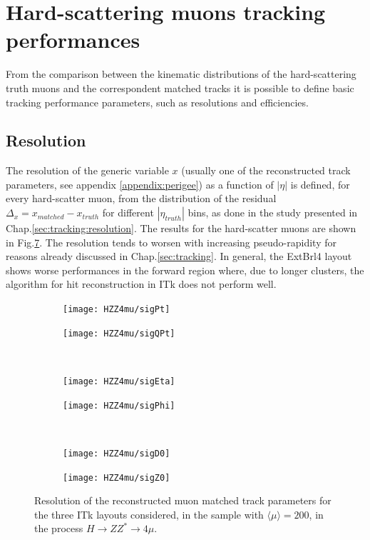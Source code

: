 \documentclass[a4paper,twoside,12pt]{book}
\begin{document}
\section{Hard-scattering muons tracking performances}
From the comparison between the kinematic distributions of the hard-scattering truth muons and the correspondent matched 
tracks it is possible to define basic tracking performance parameters, such as resolutions and efficiencies. \\

\subsection*{Resolution}
The resolution of the generic variable $x$ (usually one of the reconstructed track parameters, see appendix \ref{appendix:perigee}) as a function of $|\eta|$ is defined, for every hard-scatter muon, from the distribution of the residual 
$\Delta_x = x_{matched} - x_{truth}$ for different $|\eta_{truth}|$ bins, as done in the study presented in Chap.\ref{sec:tracking:resolution}. 
The results for the hard-scatter muons are shown in Fig.\ref{fig:HZZ4mu:muonResolution}.
The resolution tends to worsen 
with increasing pseudo-rapidity for reasons already discussed in Chap.\ref{sec:tracking}. In general, the ExtBrl4 layout shows worse performances in the forward region where, due to longer clusters, the algorithm for hit reconstruction in ITk
does not perform well.\\


\begin{figure}
\begin{subfigure}{.5\linewidth}
\texttt{[image: HZZ4mu/sigPt]}
\caption{}
\label{fig:HZZ4mu:sigPt}
\end{subfigure}
\begin{subfigure}{.5\linewidth}
\texttt{[image: HZZ4mu/sigQPt]}
\caption{}
\label{fig:HZZ4mu:sigQPt}
\end{subfigure}\\[1ex]
\begin{subfigure}{.5\linewidth}
\texttt{[image: HZZ4mu/sigEta]}
\caption{}
\label{fig:HZZ4mu:sigEta}
\end{subfigure}
\begin{subfigure}{.5\linewidth}
\texttt{[image: HZZ4mu/sigPhi]}
\caption{}
\label{fig:HZZ4mu:sigPhi}
\end{subfigure}\\[1ex]
\begin{subfigure}{.5\linewidth}
\texttt{[image: HZZ4mu/sigD0]}
\caption{}
\label{fig:HZZ4mu:sigD0}
\end{subfigure}
\begin{subfigure}{.5\linewidth}
\texttt{[image: HZZ4mu/sigZ0]}
\caption{}
\label{fig:HZZ4mu:sigZ0}
\end{subfigure}
\caption{Resolution of the reconstructed muon matched track parameters for the three ITk layouts considered, in the sample with $\langle\mu\rangle = 200$, in the process $H \rightarrow ZZ^* \rightarrow 4\mu$.}
\label{fig:HZZ4mu:muonResolution}
\end{figure}
\end{document}
